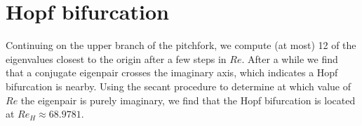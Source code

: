 \section{Hopf bifurcation}

Continuing on the upper branch of the pitchfork, we compute (at most) 12 of the eigenvalues closest to the origin after a few steps in $Re.$ After a while we find that a conjugate eigenpair crosses the imaginary axis, which indicates a Hopf bifurcation is nearby. Using the secant procedure to determine at which value of $Re$ the eigenpair is purely imaginary, we find that the Hopf bifurcation is located at $Re_H \approx 68.9781.$

